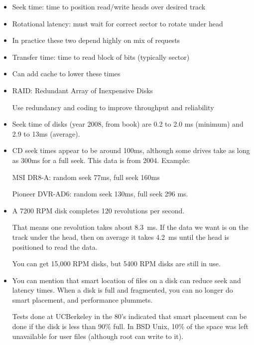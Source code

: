 \begin{frame}[fragile]
\begin{itemize}
\item Seek time: time to position read/write heads over desired track
\item Rotational latency: must wait for correct sector to rotate under
head
\item In practice these two depend highly on mix of requests
\item Transfer time: time to read block of bits (typically sector) 
\item Can add cache to lower these times
\item RAID: Redundant Array of Inexpensive Disks

	Use redundancy and coding to improve throughput and reliability
\end{itemize}
\BNotes\ifnum{}
\begin{itemize}
\item Seek time of disks (year 2008, from book) are
	0.2 to 2.0 ms (minimum) and 2.9 to 13ms (average).

\item CD seek times appear to be around 100ms, although some drives take
	as long as 300ms for a full seek.  This data is from 2004.  Example:

	MSI DR8-A: random seek 77ms, full seek 160ms

	Pioneer DVR-AD6: random seek 130ms, full seek 296 ms.


\item A 7200 RPM disk completes 120 revolutions per second.

	That means one revolution takes about 8.3~ms.  If the data we want is
	on the track under the head, then on average it takes 4.2~ms until
	the head is positioned to read the data.

	You can get 15,000 RPM disks, but 5400 RPM disks are still in use.

\item You can mention that smart location of files on a disk can reduce seek
	and latency times.  When a disk is full and fragmented, you can no
	longer do smart placement, and performance plummets.

	Tests done at UCBerkeley in the 80's indicated that smart placement
	can be done if the disk is less than 90\% full.  In BSD Unix,
	10\% of the space was left unavailable for user files (although root
	can write to it).
\end{itemize}
\fi\ENotes
\end{frame}

